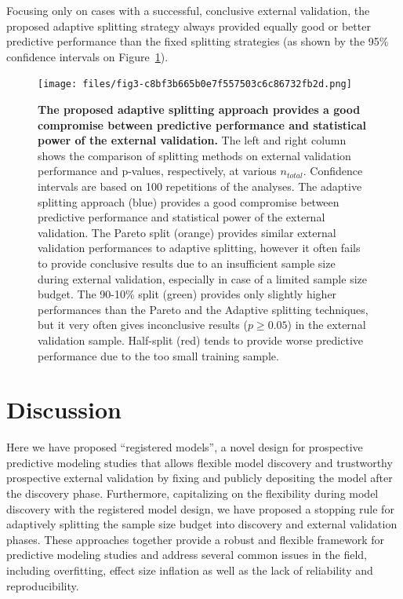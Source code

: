 \documentclass{article}
\begin{document}
Focusing only on cases with a successful, conclusive external validation, the proposed adaptive splitting strategy always provided equally good or better predictive performance than the fixed splitting strategies (as shown by the 95\% confidence intervals on Figure~\ref{fig3}).

\begin{figure}[!htbp]
\centering
\texttt{[image: files/fig3-c8bf3b665b0e7f557503c6c86732fb2d.png]}
\caption[]{\textbf{The proposed adaptive splitting approach provides a good compromise between predictive performance and statistical power of the external validation.} \newline
The left and right column shows the comparison of splitting methods on external validation performance and p-values, respectively, at various $n_{total}$. Confidence intervals are based on 100 repetitions of the analyses. The adaptive splitting approach (blue) provides a good compromise between predictive performance and statistical power of the external validation. The Pareto split (orange) provides similar external validation performances to adaptive splitting, however it often fails to provide conclusive results due to an insufficient sample size during external validation, especially in case of a limited sample size budget. The 90-10\% split (green) provides only slightly higher performances than the Pareto and the Adaptive splitting techniques, but it very often gives inconclusive results ($p\geq0.05$) in the external validation sample. Half-split (red) tends to provide worse predictive performance due to the too small training sample.}
\label{fig3}
\end{figure}

\section{Discussion}

Here we have proposed ``registered models'', a novel design for prospective predictive modeling studies that allows flexible model discovery and trustworthy prospective external validation by fixing and publicly depositing the model after the discovery phase. Furthermore, capitalizing on the flexibility during model discovery with the registered model design, we have proposed a stopping rule for adaptively splitting the sample size budget into discovery and external validation phases. These approaches together provide a robust and flexible framework for predictive modeling studies and address several common issues in the field, including overfitting, effect size inflation as well as the lack of reliability and reproducibility.
\end{document}
